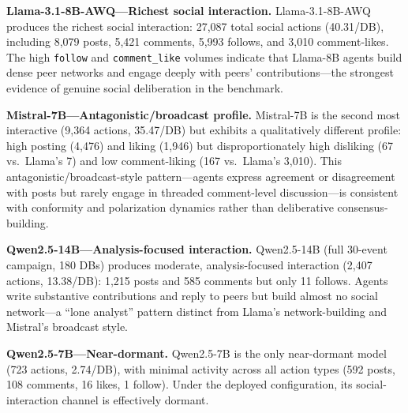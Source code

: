 \documentclass[11pt,journal,onecolumn]{IEEEtran}
\begin{document}
\textbf{Llama-3.1-8B-AWQ---Richest social interaction.} Llama-3.1-8B-AWQ produces the richest social interaction: 27,087 total social actions (40.31/DB), including 8,079 posts, 5,421 comments, 5,993 follows, and 3,010 comment-likes. The high \texttt{follow} and \texttt{comment\_like} volumes indicate that Llama-8B agents build dense peer networks and engage deeply with peers' contributions---the strongest evidence of genuine social deliberation in the benchmark.

\textbf{Mistral-7B---Antagonistic/\allowbreak broadcast profile.} Mistral-7B is the second most interactive (9,364 actions, 35.47/DB) but exhibits a qualitatively different profile: high posting (4,476) and liking (1,946) but disproportionately high disliking (67 vs.\ Llama's 7) and low comment-liking (167 vs.\ Llama's 3,010). This antagonistic/\allowbreak broadcast-style pattern---agents express agreement or disagreement with posts but rarely engage in threaded comment-level discussion---is consistent with conformity and polarization dynamics rather than deliberative consensus-building.

\textbf{Qwen2.5-14B---Analysis-focused interaction.} Qwen2.5-14B (full 30-event campaign, 180 DBs) produces moderate, analysis-focused interaction (2,407 actions, 13.38/DB): 1,215 posts and 585 comments but only 11 follows. Agents write substantive contributions and reply to peers but build almost no social network---a ``lone analyst'' pattern distinct from Llama's network-building and Mistral's broadcast style.

\textbf{Qwen2.5-7B---Near-dormant.} Qwen2.5-7B is the only near-dormant model (723 actions, 2.74/DB), with minimal activity across all action types (592 posts, 108 comments, 16 likes, 1 follow). Under the deployed configuration, its social-interaction channel is effectively dormant.
\end{document}
